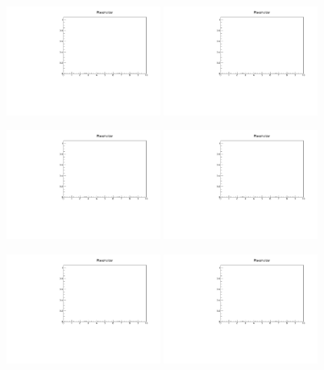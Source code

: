 \begin{figure}
\includegraphics[width=0.45\textwidth]{11-Absorber/Figures/placeholder.pdf}\hfil
\includegraphics[width=0.45\textwidth]{11-Absorber/Figures/placeholder.pdf}

\includegraphics[width=0.45\textwidth]{11-Absorber/Figures/placeholder.pdf}\hfil
\includegraphics[width=0.45\textwidth]{11-Absorber/Figures/placeholder.pdf}

\includegraphics[width=0.45\textwidth]{11-Absorber/Figures/placeholder.pdf}\hfil
\includegraphics[width=0.45\textwidth]{11-Absorber/Figures/placeholder.pdf}


\end{figure}
